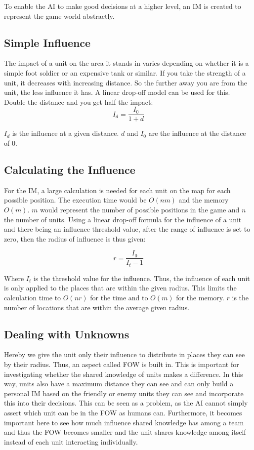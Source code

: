 \documentclass[]{report}
\begin{document}
To enable the AI to make good decisions at a higher level, an \ac{IM} is created to represent the game world abstractly.

\subsection{Simple Influence}
The impact of a unit on the area it stands in varies depending on whether it is a simple foot soldier or an expensive tank or similar. If you take the strength of a unit, it decreases with increasing distance. So the further away you are from the unit, the less influence it has. A linear drop-off model can be used for this. Double the distance and you get half the impact:
$$I_{d} = \frac{I_{0}}{1 + d}$$

$I_{d}$ is the influence at a given distance. $d$ and $I_{0}$ are the influence at the distance of 0.

\subsection{Calculating the Influence}
For the \ac{IM}, a large calculation is needed for each unit on the map for each possible position. The execution time would be $O(nm)$ and the memory $O(m)$. $m$ would represent the number of possible positions in the game and $n$ the number of units. Using a linear drop-off formula for the influence of a unit and there being an influence threshold value, after the range of influence is set to zero, then the radius of influence is thus given:

$$r = \frac{I_0}{I_t - 1}$$

Where $I_t$ is the threshold value for the influence. Thus, the influence of each unit is only applied to the places that are within the given radius. This limits the calculation time to $O(nr)$ for the time and to $O(m)$ for the memory. $r$ is the number of locations that are within the average given radius.

\subsection{Dealing with Unknowns}
Hereby we give the unit only their influence to distribute in places they can see by their radius. Thus, an aspect called \ac{FOW} is built in. This is important for investigating whether the shared knowledge of units makes a difference. In this way, units also have a maximum distance they can see and can only build a personal \ac{IM} based on the friendly or enemy units they can see and incorporate this into their decisions. This can be seen as a problem, as the \ac{AI} cannot simply assert which unit can be in the \ac{FOW} as humans can. Furthermore, it becomes important here to see how much influence shared knowledge has among a team and thus the \ac{FOW} becomes smaller and the unit shares knowledge among itself instead of each unit interacting individually.
\end{document}
